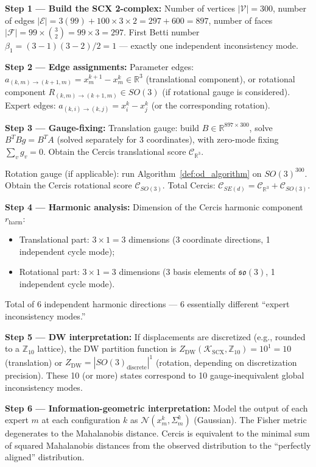 \documentclass[12pt,a4paper]{article}
\theoremstyle{definition}
\theoremstyle{remark}
\theoremstyle{definition}
\newcommand{\R}{\mathbb{R}}
\newcommand{\Z}{\mathbb{Z}}
\newcommand{\SEN}{SE(d)}
\newcommand{\SOthree}{SO(3)}
\newcommand{\verts}{\mathcal{V}}
\newcommand{\edgs}{\mathcal{E}}
\newcommand{\faces}{\mathcal{F}}
\newcommand{\cercis}{\mathcal{C}}
\newcommand{\DW}{\mathrm{DW}}
\newcommand{\ZBetti}{\beta_1}
\begin{document}
\textbf{Step 1 — Build the SCX 2-complex:}
Number of vertices $|\verts| = 300$, number of edges $|\edgs| = 3(99) + 100 \times 3 \times 2 = 297 + 600 = 897$,
number of faces $|\faces| = 99 \times \binom{3}{2} = 99 \times 3 = 297$.
First Betti number $\ZBetti = (3-1)(3-2)/2 = 1$ — exactly one independent inconsistency mode.

\textbf{Step 2 — Edge assignments:}
Parameter edges: $a_{(k,m) \to (k+1,m)} = x_m^{k+1} - x_m^k \in \R^3$ (translational component),
or rotational component $R_{(k,m) \to (k+1,m)} \in \SOthree$ (if rotational gauge is considered).
Expert edges: $a_{(k,i) \to (k,j)} = x_i^k - x_j^k$ (or the corresponding rotation).

\textbf{Step 3 — Gauge-fixing:}
Translation gauge: build $B \in \R^{897 \times 300}$, solve $B^T B g = B^T A$ (solved separately for 3 coordinates),
with zero-mode fixing $\sum_v g_v = 0$.
Obtain the Cercis translational score $\cercis_{\R^3}$.

Rotation gauge (if applicable): run Algorithm~\ref{def:od_algorithm} on $\SOthree^{300}$.
Obtain the Cercis rotational score $\cercis_{\SOthree}$.
Total Cercis: $\cercis_{\SEN} = \cercis_{\R^3} + \cercis_{\SOthree}$.

\textbf{Step 4 — Harmonic analysis:}
Dimension of the Cercis harmonic component $r_{\text{harm}}$:
\begin{itemize}
    \item Translational part: $3 \times 1 = 3$ dimensions (3 coordinate directions, 1 independent cycle mode);
    \item Rotational part: $3 \times 1 = 3$ dimensions (3 basis elements of $\mathfrak{so}(3)$, 1 independent cycle mode).
\end{itemize}
Total of 6 independent harmonic directions — 6 essentially different ``expert inconsistency modes.''

\textbf{Step 5 — DW interpretation:}
If displacements are discretized (e.g., rounded to a $\Z_{10}$ lattice), the DW partition function is
$Z_{\DW}(\mathcal{K}_{\text{SCX}}, \Z_{10}) = 10^1 = 10$ (translation) or
$Z_{\DW} = |\SOthree_{\text{discrete}}|^1$ (rotation, depending on discretization precision).
These 10 (or more) states correspond to 10 gauge-inequivalent global inconsistency modes.

\textbf{Step 6 — Information-geometric interpretation:}
Model the output of each expert $m$ at each configuration $k$ as $\mathcal{N}(x_m^k, \Sigma_m^k)$ (Gaussian).
The Fisher metric degenerates to the Mahalanobis distance. Cercis is equivalent to the minimal sum of squared Mahalanobis distances
from the observed distribution to the ``perfectly aligned'' distribution.
\end{document}
